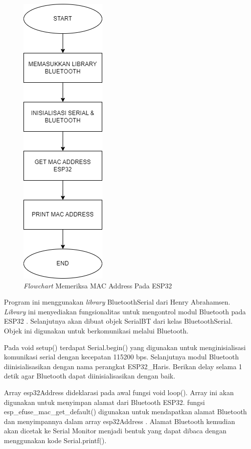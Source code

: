 \begin{figure} [ht] \centering
  \includegraphics[scale=0.7]{gambar/program/1. MAC Address.png}
  \caption{\emph{Flowchart} Memeriksa MAC Address Pada ESP32}
  \label{fig:Flowchart 1 MAC Address}
\end{figure}

\newpage

Program ini menggunakan \emph{library} BluetoothSerial dari Henry Abrahamsen. \emph{Library} ini menyediakan fungsionalitas untuk mengontrol modul Bluetooth pada ESP32 \parencite{Abrahamsen_2023}. Selanjutnya akan dibuat objek SerialBT dari kelas BluetoothSerial. Objek ini digunakan untuk berkomunikasi melalui Bluetooth. 

Pada void setup() terdapat Serial.begin() yang digunakan untuk menginisialisasi komunikasi serial dengan kecepatan 115200 bps. Selanjutnya modul Bluetooth diinisialisasikan dengan nama perangkat ESP32\_Haris. Berikan delay selama 1 detik agar Bluetooth dapat diinisialisasikan dengan baik.

Array esp32Address dideklarasi pada awal fungsi void loop(). Array ini akan digunakan untuk menyimpan alamat dari Bluetooth ESP32. fungsi esp\_efuse\_mac\_get\_default() digunakan untuk mendapatkan alamat Bluetooth dan menyimpannya dalam array esp32Address \parencite{Systems_2023}. Alamat Bluetooth kemudian akan dicetak ke Serial Monitor menjadi bentuk yang dapat dibaca dengan menggunakan kode Serial.printf(). 

